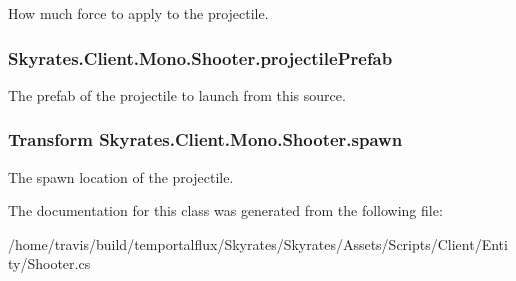 How much force to apply to the projectile. 

\hypertarget{class_skyrates_1_1_client_1_1_mono_1_1_shooter_ad0e340a8b6933645298ee8ac87100ed9}{
\subsubsection[{projectile\-Prefab}]{ Skyrates.\-Client.\-Mono.\-Shooter.\-projectile\-Prefab}}\label{class_skyrates_1_1_client_1_1_mono_1_1_shooter_ad0e340a8b6933645298ee8ac87100ed9}


The prefab of the projectile to launch from this source. 

\hypertarget{class_skyrates_1_1_client_1_1_mono_1_1_shooter_a2aeb7c35dc048f65e02ccecfc654ab2c}{
\subsubsection[{spawn}]{\setlength{\rightskip}{0pt plus 5cm}Transform Skyrates.\-Client.\-Mono.\-Shooter.\-spawn}}\label{class_skyrates_1_1_client_1_1_mono_1_1_shooter_a2aeb7c35dc048f65e02ccecfc654ab2c}


The spawn location of the projectile. 



The documentation for this class was generated from the following file\-:\begin{DoxyCompactItemize}
\item 
/home/travis/build/temportalflux/\-Skyrates/\-Skyrates/\-Assets/\-Scripts/\-Client/\-Entity/Shooter.\-cs\end{DoxyCompactItemize}
